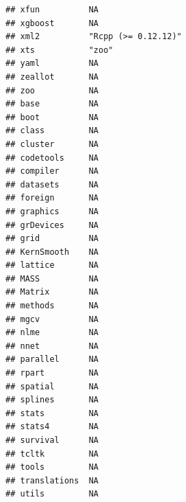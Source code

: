 \documentclass[]{article}
\begin{document}
\begin{verbatim}
## xfun          NA                                                   
## xgboost       NA                                                   
## xml2          "Rcpp (>= 0.12.12)"                                  
## xts           "zoo"                                                
## yaml          NA                                                   
## zeallot       NA                                                   
## zoo           NA                                                   
## base          NA                                                   
## boot          NA                                                   
## class         NA                                                   
## cluster       NA                                                   
## codetools     NA                                                   
## compiler      NA                                                   
## datasets      NA                                                   
## foreign       NA                                                   
## graphics      NA                                                   
## grDevices     NA                                                   
## grid          NA                                                   
## KernSmooth    NA                                                   
## lattice       NA                                                   
## MASS          NA                                                   
## Matrix        NA                                                   
## methods       NA                                                   
## mgcv          NA                                                   
## nlme          NA                                                   
## nnet          NA                                                   
## parallel      NA                                                   
## rpart         NA                                                   
## spatial       NA                                                   
## splines       NA                                                   
## stats         NA                                                   
## stats4        NA                                                   
## survival      NA                                                   
## tcltk         NA                                                   
## tools         NA                                                   
## translations  NA                                                   
## utils         NA                                                   

\end{verbatim}
\end{document}

